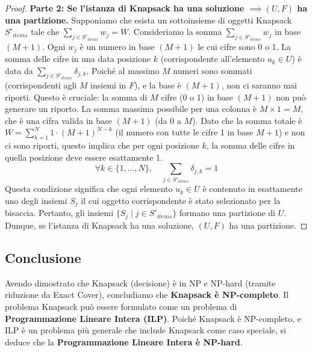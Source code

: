 \documentclass[a4paper]{article}
\begin{document}
\begin{proof}
\textbf{Parte 2: Se l'istanza di Knapsack ha una soluzione $\implies (U, F)$ ha una partizione.}
Supponiamo che esista un sottoinsieme di oggetti Knapsack $S'_{items}$ tale che $\sum_{j \in S'_{items}} w_j = W$.
Consideriamo la somma $\sum_{j \in S'_{items}} w_j$ in base $(M+1)$. Ogni $w_j$ è un numero in base $(M+1)$ le cui cifre sono 0 o 1.
La somma delle cifre in una data posizione $k$ (corrispondente all'elemento $u_k \in U$) è data da $\sum_{j \in S'_{items}} \delta_{j,k}$. Poiché al massimo $M$ numeri sono sommati (corrispondenti agli $M$ insiemi in $F$), e la base è $(M+1)$, non ci saranno mai riporti. Questo è cruciale: la somma di $M$ cifre (0 o 1) in base $(M+1)$ non può generare un riporto. La somma massima possibile per una colonna è $M \times 1 = M$, che è una cifra valida in base $(M+1)$ (da 0 a $M$).
Dato che la somma totale è $W = \sum_{k=1}^N 1 \cdot (M+1)^{N-k}$ (il numero con tutte le cifre 1 in base $M+1$) e non ci sono riporti, questo implica che per ogni posizione $k$, la somma delle cifre in quella posizione deve essere esattamente 1.
\[ \forall k \in \{1, \ldots, N\}, \quad \sum_{j \in S'_{items}} \delta_{j,k} = 1 \]
Questa condizione significa che ogni elemento $u_k \in U$ è contenuto in esattamente uno degli insiemi $S_j$ il cui oggetto corrispondente è stato selezionato per la bisaccia.
Pertanto, gli insiemi $\{S_j \mid j \in S'_{items}\}$ formano una partizione di $U$.
Dunque, se l'istanza di Knapsack ha una soluzione, $(U, F)$ ha una partizione.
\end{proof}

\subsection{Conclusione}
Avendo dimostrato che Knapsack (decisione) è in NP e NP-hard (tramite riduzione da Exact Cover), concludiamo che \textbf{Knapsack è NP-completo}.
Il problema Knapsack può essere formulato come un problema di \textbf{Programmazione Lineare Intera (ILP)}. Poiché Knapsack è NP-completo, e ILP è un problema più generale che include Knapsack come caso speciale, si deduce che la \textbf{Programmazione Lineare Intera è NP-hard}.
\end{document}
